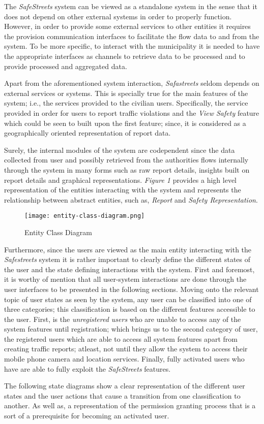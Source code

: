 The \emph{SafeStreets} system can be viewed as a standalone system in the sense that it does not depend on other external systems in order to properly function. However, in order to provide some external services to other entities it requires the provision communication interfaces to facilitate the flow data to and from the system. To be more specific, to interact with the municipality it is needed to have the appropriate interfaces as channels to retrieve data to be processed and to provide processed and aggregated data.

Apart from the aforementioned system interaction, \emph{Safastreets} seldom depends on external services or systems. This is specially true for the main features of the system; i.e., the services provided to the civilian users. Specifically, the service provided in order for users to report traffic violations and the \emph{View Safety} feature which could be seen to built upon the first feature; since, it is considered as a geographically oriented representation of report data.

Surely, the internal modules of the system are codependent since the data collected from user and possibly retrieved from the authorities flows internally through the system in many forms such as raw report details, insights built on report details and graphical representations. \emph{Figure 1} provides a high level representation of the entities interacting with the system and represents the relationship between abstract entities, such as, \emph{Report} and \emph{Safety Representation}.

\begin{sidewaysfigure}
\begin{figure}[H]
\caption{Entity Class Diagram}
\label{fig:Class}
\centering
\texttt{[image: entity-class-diagram.png]}
\end{figure}
\end{sidewaysfigure}

Furthermore, since the users are viewed as the main entity interacting with the \emph{Safestreets} system it is rather important to clearly define the different states of the user and the state defining interactions with the system. First and foremost, it is worthy of mention that all user-system interactions are done through the user interfaces to be presented in the following sections. Moving onto the relevant topic of user states as seen by the system, any user can be classified into one of three categories; this classification is based on the different features accessible to the user. First, is the \emph{unregistered users} who are unable to access any of the system features until registration; which brings us to the second category of user, the registered users which are able to access all system features apart from creating traffic reports; atleast, not until they allow the system to access their mobile phone camera and location services. Finally, fully activated users who have are able to fully exploit the \emph{SafeStreets} features.

The following state diagrams show a clear representation of the different user states and the user actions that cause a transition from one classification to another. As well as, a representation of the permission granting process that is a sort of a prerequisite for becoming an activated user.
